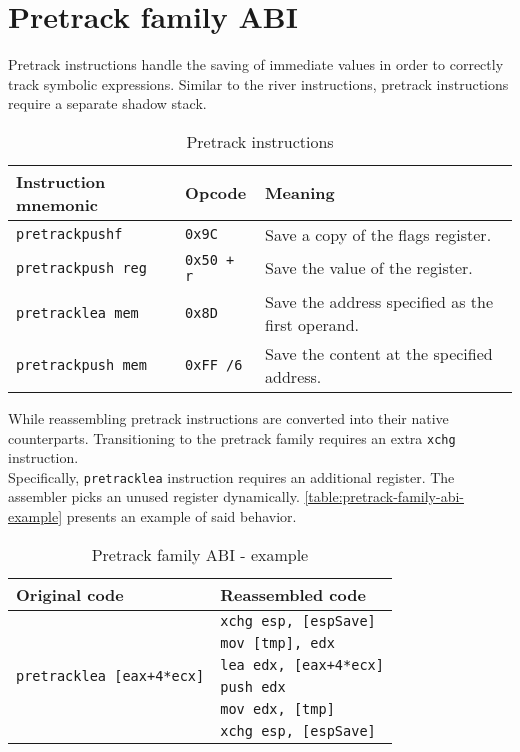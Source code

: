 \documentclass[12pt]{report}
\begin{document}
\section{Pretrack family ABI}
\label{sec:pretrack-family-abi}
Pretrack instructions handle the saving of immediate values in order to correctly track symbolic expressions. Similar to the river instructions, pretrack instructions require a separate shadow stack.\\
\begin{table}[H]
	\begin{tabular}{| l | l | l |}
		\hline
		\textbf{Instruction mnemonic} & \textbf{Opcode}   & \textbf{Meaning}\\ \hline
		\texttt{pretrackpushf}        & \texttt{0x9C}     & Save a copy of the flags register.\\ \hline
		\texttt{pretrackpush reg}     & \texttt{0x50 + r} & Save the value of the register.\\ \hline
		\texttt{pretracklea mem}      & \texttt{0x8D}     & Save the address specified as the first operand.\\ \hline
		\texttt{pretrackpush mem}     & \texttt{0xFF /6}  & Save the content at the specified address.\\ \hline
	\end{tabular}
	\caption{Pretrack instructions}
\end{table}
While reassembling pretrack instructions are converted into their native counterparts. Transitioning to the pretrack family requires an extra \texttt{xchg} instruction.\\
\newline
Specifically, \texttt{pretracklea} instruction requires an additional register. The assembler picks an unused register dynamically. \autoref{table:pretrack-family-abi-example} presents an example of said behavior.\\
\begin{table}[H]
	\centering
	\begin{tabular}{| l | l |}
		\hline
		\textbf{Original code} & \textbf{Reassembled code}\\ \hline
		\multirow{6}{*}{\texttt{pretracklea [eax+4*ecx]}} & \texttt{xchg esp, [espSave]}\\
		& \texttt{mov [tmp], edx}\\
		& \texttt{lea edx, [eax+4*ecx]}\\
		& \texttt{push edx}\\
		& \texttt{mov edx, [tmp]}\\
		& \texttt{xchg esp, [espSave]}\\ \hline
	\end{tabular}
	\caption{Pretrack family ABI - example}
	\label{table:pretrack-family-abi-example}
\end{table}
\end{document}
